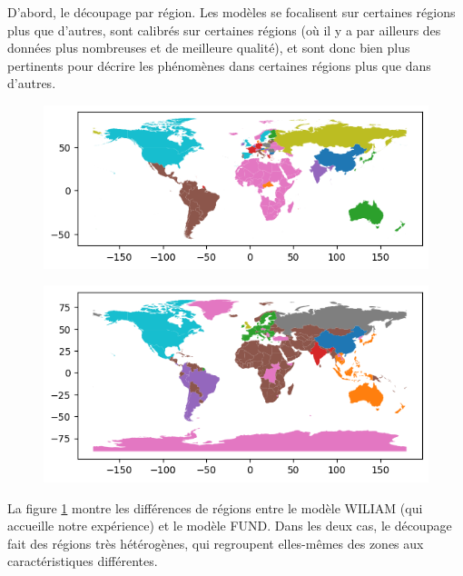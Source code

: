 D'abord, le découpage par région. Les modèles se focalisent sur certaines régions plus que d'autres, sont calibrés sur certaines régions (où il y a par ailleurs des données plus nombreuses et de meilleure qualité), et sont donc bien plus pertinents pour décrire les phénomènes dans certaines régions plus que dans d'autres.  

\begin{figure}[htbp]
    \centering
    \begin{minipage}{0.45\textwidth}
        \centering
        \includegraphics[width=\linewidth]{figures/FUND_regions.png} %
        \label{fig:carte_fund}
    \end{minipage}%
    \hfill
    \begin{minipage}{0.45\textwidth}
        \centering
        \includegraphics[width=\linewidth]{figures/WILIAM_regions.png} %
        \label{fig:carte_WILIAM}
    \end{minipage}%
    \label{fig:trois_cartes}
\end{figure} 

La figure \ref{fig:trois_cartes} montre les différences de régions entre le modèle WILIAM (qui accueille notre expérience) et le modèle FUND. Dans les deux cas, le découpage fait des régions très hétérogènes, qui regroupent elles-mêmes des zones aux caractéristiques différentes. 

